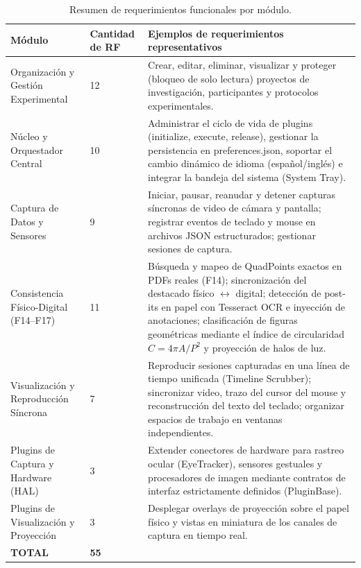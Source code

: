 \begin{table}[H]
    \centering
    \caption{Resumen de requerimientos funcionales por módulo.}
    \label{tab:rf_resumen}
    \begin{small}
    \begin{tabular}{|L{3.0cm}|L{1.4cm}|L{9.4cm}|}
        \hline
        \textbf{Módulo} & \textbf{Cantidad de RF} & \textbf{Ejemplos de requerimientos representativos} \\ \hline
        Organización y Gestión Experimental & 12 & Crear, editar, eliminar, visualizar y proteger (bloqueo de solo lectura) proyectos de investigación, participantes y protocolos experimentales. \\ \hline
        Núcleo y Orquestador Central & 10 & Administrar el ciclo de vida de plugins (initialize, execute, release), gestionar la persistencia en preferences.json, soportar el cambio dinámico de idioma (español/inglés) e integrar la bandeja del sistema (System Tray). \\ \hline
        Captura de Datos y Sensores & 9 & Iniciar, pausar, reanudar y detener capturas síncronas de video de cámara y pantalla; registrar eventos de teclado y mouse en archivos JSON estructurados; gestionar sesiones de captura. \\ \hline
        Consistencia Físico-Digital (F14--F17) & 11 & Búsqueda y mapeo de QuadPoints exactos en PDFs reales (F14); sincronización del destacado físico $\leftrightarrow$ digital; detección de post-its en papel con Tesseract OCR e inyección de anotaciones; clasificación de figuras geométricas mediante el índice de circularidad $C = 4\pi A/P^{2}$ y proyección de halos de luz. \\ \hline
        Visualización y Reproducción Síncrona & 7 & Reproducir sesiones capturadas en una línea de tiempo unificada (Timeline Scrubber); sincronizar video, trazo del cursor del mouse y reconstrucción del texto del teclado; organizar espacios de trabajo en ventanas independientes. \\ \hline
        Plugins de Captura y Hardware (HAL) & 3 & Extender conectores de hardware para rastreo ocular (EyeTracker), sensores gestuales y procesadores de imagen mediante contratos de interfaz estrictamente definidos (PluginBase). \\ \hline
        Plugins de Visualización y Proyección & 3 & Desplegar overlays de proyección sobre el papel físico y vistas en miniatura de los canales de captura en tiempo real. \\ \hline
        \textbf{TOTAL} & \textbf{55} & \\ \hline
    \end{tabular}
    \end{small}
\end{table}
 
